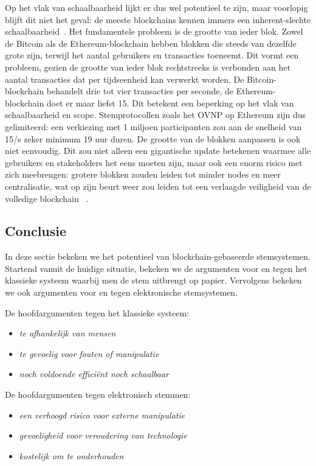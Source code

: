 	 Op het vlak van schaalbaarheid lijkt er dus wel potentieel te zijn, maar voorlopig blijft dit niet het geval: de meeste blockchains kennen immers een inherent-slechte schaalbaarheid~\autocite{Blenkinsop2018}. Het fundamentele probleem is de grootte van ieder blok. Zowel de Bitcoin als de Ethereum-blockchain hebben blokken die steeds van dezelfde grote zijn, terwijl het aantal gebruikers en transacties toeneemt. Dit vormt een probleem, gezien de grootte van ieder blok rechtstreeks is verbonden aan het aantal transacties dat per tijdseenheid kan verwerkt worden. De Bitcoin-blockchain behandelt drie tot vier transacties per seconde, de Ethereum-blockchain doet er maar liefst 15. Dit betekent een beperking op het vlak van schaalbaarheid en scope. Stemprotocollen zoals het OVNP op Ethereum zijn dus gelimiteerd: een verkiezing met 1 miljoen participanten zou aan de snelheid van 15/s zeker minimum 19 uur duren. De grootte van de blokken aanpassen is ook niet eenvoudig. Dit zou niet alleen een gigantische update betekenen waarmee alle gebruikers en stakeholders het eens moeten zijn, maar ook een enorm risico met zich meebrengen:  grotere blokken zouden leiden tot minder nodes en meer centralisatie, wat op zijn beurt weer zou leiden tot een verlaagde veiligheid van de volledige blockchain ~\autocite{Blenkinsop2018}.

	\subsection{Conclusie} 
	In deze sectie bekeken we het potentieel van blockchain-gebaseerde stemsystemen. Startend vanuit de huidige situatie, bekeken we de argumenten voor en tegen het klassieke systeem waarbij men de stem uitbrengt op papier. Vervolgens bekeken we ook argumenten voor en tegen elektronische stemsystemen.  
	
	De hoofdargumenten tegen het klassieke systeem:
	\begin{itemize}
		\item\textit{te afhankelijk van mensen}
		\item\textit{te gevoelig voor fouten of manipulatie}
		\item\textit{noch voldoende efficiënt noch schaalbaar}
	\end{itemize}
	
	De hoofdargumenten tegen elektronisch stemmen:
	
	\begin{itemize}
		\item\textit{een verhoogd risico voor externe manipulatie}
		\item\textit{gevoeligheid voor veroudering van technologie}
		\item\textit{kostelijk om te onderhouden}
	\end{itemize}
	

